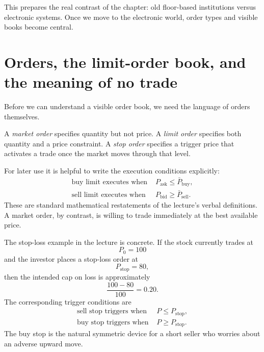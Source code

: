 This prepares the real contrast of the chapter: old floor-based institutions versus electronic systems. Once we move to the electronic world, order types and visible books become central.

\section{Orders, the limit-order book, and the meaning of no trade}

Before we can understand a visible order book, we need the language of orders themselves.

\begin{definition}
A \emph{market order} specifies quantity but not price. A \emph{limit order} specifies both quantity and a price constraint. A \emph{stop order} specifies a trigger price that activates a trade once the market moves through that level.
\end{definition}

For later use it is helpful to write the execution conditions explicitly:
\begin{align}
\text{buy limit executes when } & P_{\text{ask}} \le \bar P_{\text{buy}}, \\
\text{sell limit executes when } & P_{\text{bid}} \ge \bar P_{\text{sell}}.
\end{align}
These are standard mathematical restatements of the lecture's verbal definitions. A market order, by contrast, is willing to trade immediately at the best available price.

The stop-loss example in the lecture is concrete. If the stock currently trades at
\begin{equation}
P_0 = 100
\end{equation}
and the investor places a stop-loss order at
\begin{equation}
P_{\text{stop}} = 80,
\end{equation}
then the intended cap on loss is approximately
\begin{equation}
\frac{100-80}{100}=0.20.
\end{equation}
The corresponding trigger conditions are
\begin{align}
\text{sell stop triggers when } & P \le P_{\text{stop}}, \\
\text{buy stop triggers when } & P \ge P_{\text{stop}}.
\end{align}
The buy stop is the natural symmetric device for a short seller who worries about an adverse upward move.

